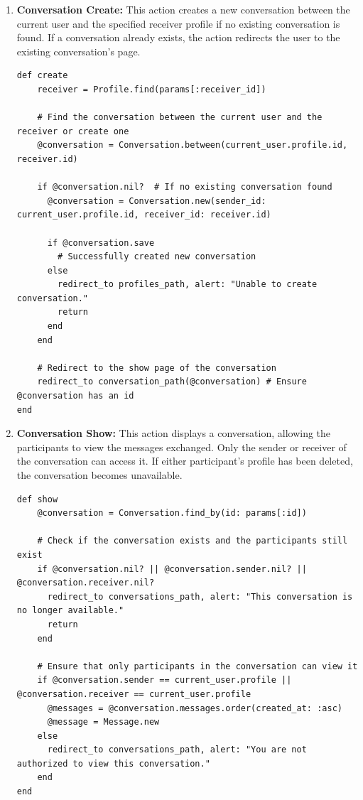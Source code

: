 \begin{enumerate}
    \item \textbf{Conversation Create:} 
    This action creates a new conversation between the current user and the specified receiver profile if no existing conversation is found. If a conversation already exists, the action redirects the user to the existing conversation’s page.
    \begin{lstlisting}
def create
    receiver = Profile.find(params[:receiver_id])
  
    # Find the conversation between the current user and the receiver or create one
    @conversation = Conversation.between(current_user.profile.id, receiver.id)
  
    if @conversation.nil?  # If no existing conversation found
      @conversation = Conversation.new(sender_id: current_user.profile.id, receiver_id: receiver.id)
  
      if @conversation.save
        # Successfully created new conversation
      else
        redirect_to profiles_path, alert: "Unable to create conversation."
        return
      end
    end
  
    # Redirect to the show page of the conversation
    redirect_to conversation_path(@conversation) # Ensure @conversation has an id
end
    \end{lstlisting}
    
    \item \textbf{Conversation Show:} 
    This action displays a conversation, allowing the participants to view the messages exchanged. Only the sender or receiver of the conversation can access it. If either participant's profile has been deleted, the conversation becomes unavailable.
    \begin{lstlisting}
def show
    @conversation = Conversation.find_by(id: params[:id])
  
    # Check if the conversation exists and the participants still exist
    if @conversation.nil? || @conversation.sender.nil? || @conversation.receiver.nil?
      redirect_to conversations_path, alert: "This conversation is no longer available."
      return
    end
  
    # Ensure that only participants in the conversation can view it
    if @conversation.sender == current_user.profile || @conversation.receiver == current_user.profile
      @messages = @conversation.messages.order(created_at: :asc)
      @message = Message.new
    else
      redirect_to conversations_path, alert: "You are not authorized to view this conversation."
    end
end
    \end{lstlisting}


\end{enumerate}

